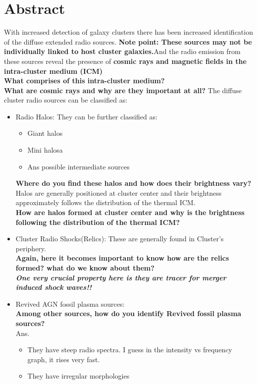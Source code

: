 \documentclass[11pt]{report}
\begin{document}
\section{Abstract}
With increased detection of galaxy clusters there has been increased identification of the diffuse extended radio sources. \textbf{Note point: These sources may not be individually linked to host cluster galaxies.}And the radio emission from these sources reveal the presence of \textbf{cosmic rays and magnetic fields in the intra-cluster medium (ICM)}\\
\textbf{What comprises of this intra-cluster medium?}\\
\textbf{What are cosmic rays and why are they important at all?}
The diffuse cluster radio sources can be classified as:
\begin{itemize}
\item Radio Halos: They can be further classified as:
\begin{itemize}
\item Giant halos
\item Mini halosa
\item Ans possible intermediate sources
\end{itemize}
\textbf{Where do you find these halos and how does their brightness vary?}\\
 Halos are generally positioned at cluster center and their brightness approximately follows the distribution of the thermal ICM.\\
 \textbf{How are halos formed at cluster center and why is the brightness following the distribution of the thermal ICM?}\\
\item Cluster Radio Shocks(Relics): These are generally found in Cluster's periphery.\\
\textbf{Again, here it becomes important to know how are the relics formed? what do we know about them?}\\
\textbf{\textit{One very crucial property here is they are tracer for merger induced shock waves!!}}
\item Revived AGN fossil plasma sources:\\
\textbf{Among other sources, how do you identify Revived fossil plasma sources?}\\
Ans. \begin{itemize}
\item They have steep radio spectra. I guess in the intensity vs frequency graph, it rises very fast.
\item They have irregular morphologies
\end{itemize}
\end{itemize}
\end{document}
